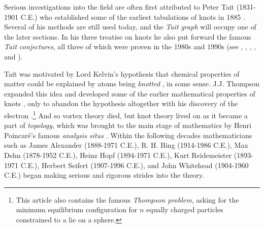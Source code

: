 \par\hfill\par
Serious investigations into the field are often first attributed to Peter Tait
(1831-1901 C.E.) who established some of the earliest tabulations of knots
in 1885 \cite{TaitOnKnots1885}. Several of his methods are still used today,
and the \textit{Tait graph} will occupy one of the later sections.
In his three treatise on knots he also put forward the famous
\textit{Tait conjectures}, all three of which were proven in the 1980s and
1990s (see \cite{MurasugiJonesPolynomial}, \cite{KauffmanStateModels},
\cite{ThistlethwaiteSpanningTree}, \cite{ThistlethwaiteKauffmanPolynomial},
and \cite{ThistlethwiateMenascoAlternatingLinks}).

\par\hfill\par
Tait was motivated by Lord Kelvin's hypothesis that chemical properties
of matter could be explained by atoms being \textit{knotted}
\cite{ThompsonVortex1867}, in some sense. J.J. Thompson expanded this idea and
developed some of the earlier mathematical properties of knots
\cite{ThompsonVortexRings1883}, only to abandon the hypothesis altogether with
his discovery of the electron \cite{ThompsonStructureOfAtoms1904}.\footnote{%
    This article also contains the famous \textit{Thompson problem}, asking for
    the minimum equilibrium configuration for $n$ equally charged particles
    constrained to a lie on a sphere.
}
And so vortex theory died, but knot theory lived on as it became a part of
\textit{topology}, which was brought to the main stage of mathematics
by Henri Poincar\'{e}'s famous \textit{analysis situs}
\cite{PoincareAnalysisSitus1895}. Within the following decades mathematicians
such as James Alexander (1888-1971 C.E.), R. H. Bing (1914-1986 C.E.),
Max Dehn (1878-1952 C.E.), Heinz Hopf (1894-1971 C.E.),
Kurt Reidemeister (1893-1971 C.E.), Herbert Seifert (1907-1996 C.E.),
and John Whitehead (1904-1960 C.E.) began making serious and rigorous strides
into the theory.
